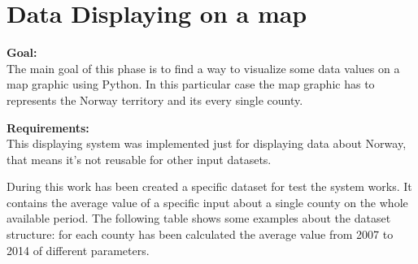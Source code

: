 \newpage

\section{Data Displaying on a map}
\textbf{Goal:}\\
The main goal of this phase is to find a way to visualize some data values on a map graphic using Python. In this particular case the map graphic has to represents the Norway territory and its every single county.


\textbf{Requirements:}\\
This displaying system was implemented just for displaying data about Norway, that means it's not reusable for other input datasets.

During this work has been created a specific dataset for test the system works. It contains the average value of a specific input about a single county on the whole available period. The following table shows some examples about the dataset structure: for each county has been calculated the average value from 2007 to 2014 of different parameters.\\

\\
    

